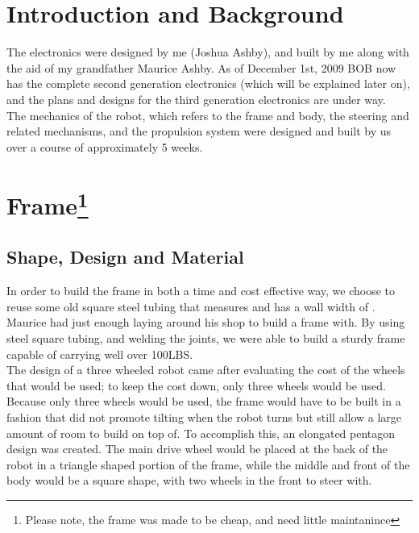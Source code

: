 \documentclass{article}
\begin{document}
\section{Introduction and Background}
The electronics were designed by me (Joshua Ashby), and built by me along with the aid of my grandfather Maurice Ashby. As of December 1st, 2009 BOB now has the complete second generation electronics (which will be explained later on), and the plans and designs for the third generation electronics are under way.\\
The mechanics of the robot, which refers to the frame and body, the steering and related mechanisms, and the propulsion system were designed and built by us over a course of approximately 5 weeks.\\
\section{Frame\footnote{Please note, the frame was made to be cheap, and need little maintanince}%
}
\subsection{Shape, Design and Material}
In order to build the frame in both a time and cost effective way, we choose to reuse some old square steel tubing that measures and has a wall width of . Maurice had just enough laying around his shop to build a frame with. By using steel square tubing, and welding the joints, we were able to build a sturdy frame capable of carrying well over 100LBS.\\
The design of a three wheeled robot came after evaluating the cost of the wheels that would be used; to keep the cost down, only three wheels would be used. Because only three wheels would be used, the frame would have to be built in a fashion that did not promote tilting when the robot turns but still allow a large amount of room to build on top of. To accomplish this, an elongated pentagon design was created. The main drive wheel would be placed at the back of the robot in a triangle shaped portion of the frame, while the middle and front of the body would be a square shape, with two wheels in the front to steer with.\\
\end{document}
